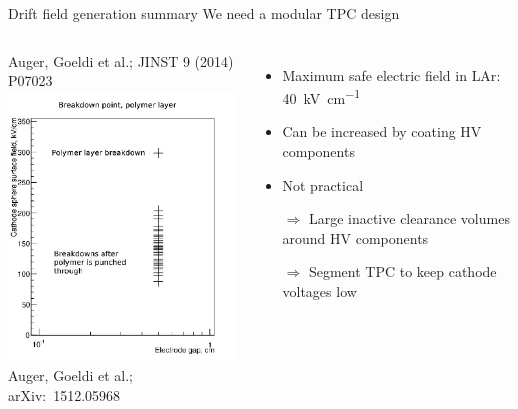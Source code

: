 \documentclass[]{beamer}
\newcommand*{\emphcol}{red}
\newcommand*{\emphcoltitle}{blue}
\newcommand*{\lar}{{LAr}}
\begin{document}
\begin{frame}{Drift field generation summary}{\color{\emphcoltitle} We need a modular TPC design}
	\begin{columns}[c]
		{\tiny Auger, Goeldi et al.; JINST 9 (2014) P07023~\cite{latex}} \\
		\centering
		\includegraphics[width=\textwidth]{defence/breakdown_latex}\\
		{\tiny Auger, Goeldi et al.; arXiv:~1512.05968~\cite{breakdown_16}}
		\begin{itemize}
			\item Maximum safe electric field in \lar{}: \SI{40}{\kilo\volt\per\centi\metre}
			\item Can be increased by coating HV components
			\item Not practical
			\item[$\Rightarrow$] Large inactive clearance volumes around HV components
			\item[$\Rightarrow$] {\color{\emphcol} Segment TPC to keep cathode voltages low}
		\end{itemize}
	\end{columns}
\end{frame}
\end{document}
